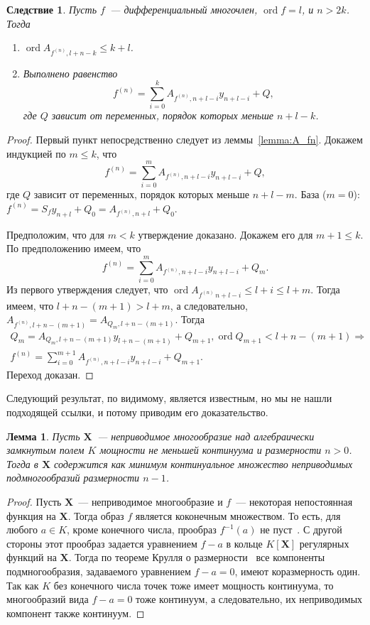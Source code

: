 \documentclass[16pt]{article}
\DeclareMathOperator{\ord}{ord}
\renewcommand{\le}{\leqslant} %
\theoremstyle{plain1}
\newtheorem{lemma}[theorem1]{Лемма}
\theoremstyle{plain2}
\theoremstyle{plain}
\theoremstyle{plain3}
\newtheorem*{corollary*}{Следствие}
\theoremstyle{definition}
\theoremstyle{remark}
\begin{document}
\begin{corollary*}\label{corollary:deriv_equal}
Пусть $f$~--- дифференциальный многочлен, $\ord f =l$, и $n>2k$.
Тогда
\begin{enumerate}
\item $\ord A_{f^{(n)},l+n-k}\leqslant k+l$.

\item Выполнено равенство
$$
f^{(n)}=\sum\limits_{i=0}^{k} A_{f^{(n)},n+l -i}y_{n+l -i} + Q,
$$
где $Q$ зависит от переменных, порядок которых меньше $n+l-k$.
\end{enumerate}
\end{corollary*}
\begin{proof} Первый пункт непосредственно следует из леммы~\ref{lemma:A_fn}. Докажем индукцией по $m\le k$, что
$$
f^{(n)}=\sum\limits_{i=0}^{m} A_{f^{(n)},n+l -i}y_{n+l -i} + Q,
$$
где $Q$  зависит от переменных, порядок которых меньше $n+l-m$. База ($m = 0$): $f^{(n)}=S_fy_{n+l}+Q_0=A_{f^{(n)}, n + l}+Q_0$.

Предположим, что для $m<k$ утверждение доказано. Докажем его для $m+1\le k$. По предположению имеем, что
$$
f^{(n)}=\sum\limits_{i=0}^{m} A_{f^{(n)},n+l -i}y_{n+l -i} + Q_m.
$$
Из первого утверждения следует, что $\ord A_{f^{(n)}\,n+l -i}\le l+i\le l+m$. Тогда имеем, что $l+n-(m+1)>l+m$, а следовательно, $A_{f^{(n)}, l+n-(m+1)} = A_{Q_{m}, l+n-(m+1)}$.
Тогда
\begin{gather*}Q_{m}=A_{Q_{m}, l+n-(m+1)}y_{l+n-(m+1)}+Q_{m+1},\ord Q_{m+1}<l+n-(m+1)\Rightarrow \\ f^{(n)}=\sum\limits_{i=0}^{m+1} A_{f^{(n)},n+l -i}y_{n+l -i} + Q_{m+1}.
\end{gather*}
Переход доказан.
\end{proof}

Следующий результат, по видимому, является известным, но мы не нашли
подходящей ссылки, и потому приводим его доказательство.

\begin{lemma} \label{lemma:sb_vr_cntm}
Пусть $\mathbf{X}$~--- неприводимое многообразие над алгебраически замкнутым полем $K$
мощности не меньшей континуума и размерности $n>0$. Тогда в
$\mathbf{X}$ содержится как минимум континуальное множество
неприводимых подмногообразий размерности $n-1$.
\end{lemma}

\begin{proof}
Пусть $\mathbf{X}$~--- неприводимое многообразие и $f$~--- некоторая
непостоянная функция на $\mathbf{X}$. Тогда образ $f$ является
коконечным множеством. То есть, для любого $a\in K$, кроме конечного
числа, прообраз $f^{-1}(a)$ не пуст~\cite[Глава 2, параграф 3, упр 3.19]{Hartshorn}. С другой стороны
этот прообраз задается уравнением $f-a$ в кольце $K[\mathbf{X}]$
регулярных функций на $\mathbf{X}$. Тогда по теореме Крулля о размерности~\cite[Chapter~5,
Section~12, Theorem~18]{Matsumura} все
компоненты подмногообразия, задаваемого уравнением $f-a=0$, имеют
коразмерность один. Так как $K$ без конечного числа точек тоже
имеет мощность континуума, то многообразий вида $f-a=0$ тоже континуум, а следовательно, их
неприводимых компонент также континуум.
\end{proof}
\end{document}
